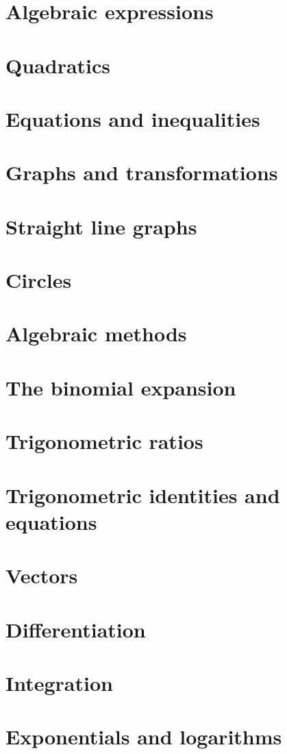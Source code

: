 \chapter{Algebraic expressions}


\chapter{Quadratics}


\chapter{Equations and inequalities}


\chapter{Graphs and transformations}


\chapter{Straight line graphs}


\chapter{Circles}


\chapter{Algebraic methods}


\chapter{The binomial expansion}


\chapter{Trigonometric ratios}


\chapter{Trigonometric identities and equations}


\chapter{Vectors}


\chapter{Differentiation}


\chapter{Integration}


\chapter{Exponentials and logarithms}
